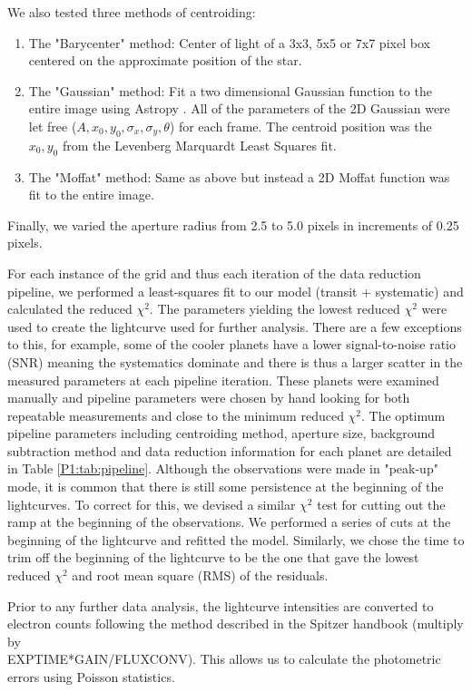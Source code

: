 We also tested three methods of centroiding:
\begin{enumerate}
    \item The "Barycenter" method: Center of light of a 3x3, 5x5 or 7x7 pixel box centered on the approximate position of the star.
    \item The "Gaussian" method: Fit a two dimensional Gaussian function to the entire image using Astropy \citep{AstropyCollaborationandPrice-Whelan2018}. All of the parameters of the 2D Gaussian were let free ($A, x_0, y_0, \sigma_x, \sigma_y,\theta$) for each frame. The centroid position was the $x_0, y_0$ from the Levenberg Marquardt Least Squares fit. \citep{Agol2010}
    \item The "Moffat" method: Same as above but instead a 2D Moffat function was fit to the entire image.
\end{enumerate}
Finally, we varied the aperture radius from 2.5 to 5.0 pixels in increments of 0.25 pixels.

For each instance of the grid and thus each iteration of the data reduction pipeline, we performed a least-squares fit to our model (transit + systematic) and calculated the reduced $\chi^2$. The parameters yielding the lowest reduced $\chi^2$ were used to create the lightcurve used for further analysis. There are a few exceptions to this, for example, some of the cooler planets have a lower signal-to-noise ratio (SNR) meaning the systematics dominate and there is thus a larger scatter in the measured parameters at each pipeline iteration. These planets were examined manually and pipeline parameters were chosen by hand looking for both repeatable measurements and close to the minimum reduced $\chi^2$. The optimum pipeline parameters including centroiding method, aperture size, background subtraction method and data reduction information for each planet are detailed in Table \ref{P1:tab:pipeline}. Although the observations were made in "peak-up" mode, it is common that there is still some persistence at the beginning of the lightcurves. To correct for this, we devised a similar $\chi^2$ test for cutting out the ramp at the beginning of the observations. We performed a series of cuts at the beginning of the lightcurve and refitted the model. Similarly, we chose the time to trim off the beginning of the lightcurve to be the one that gave the lowest reduced $\chi^2$ and root mean square (RMS) of the residuals.

Prior to any further data analysis, the lightcurve intensities are converted to electron counts following the method described in the Spitzer handbook (multiply by \\ EXPTIME*GAIN/FLUXCONV). This allows us to calculate the photometric errors using Poisson statistics.

